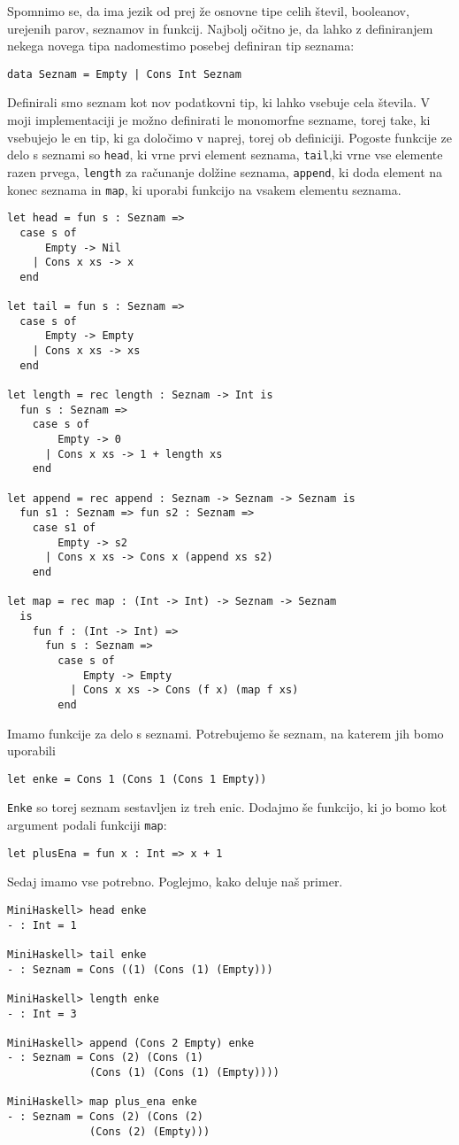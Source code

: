 \documentclass[12pt,a4paper,openany]{book}
\begin{document}
Spomnimo se, da ima jezik od prej že osnovne tipe celih števil, booleanov, urejenih parov, seznamov in funkcij. Najbolj očitno je, da lahko z definiranjem nekega novega tipa nadomestimo posebej 
definiran tip seznama:
\begin{lstlisting}
data Seznam = Empty | Cons Int Seznam
\end{lstlisting}
Definirali smo seznam kot nov podatkovni tip, ki lahko vsebuje cela števila. V moji implementaciji je možno definirati le monomorfne sezname, torej take, ki vsebujejo le en tip, ki ga določimo v naprej, torej ob definiciji. 
Pogoste funkcije ze delo s seznami so \lstinline{head}, ki vrne prvi element seznama, \lstinline{tail},ki vrne vse elemente razen prvega, \lstinline{length} za računanje 
dolžine seznama, \lstinline{append}, ki doda element na konec seznama in \lstinline{map}, ki uporabi funkcijo na vsakem elementu seznama. 
\begin{lstlisting}
let head = fun s : Seznam => 
  case s of
      Empty -> Nil
    | Cons x xs -> x
  end

let tail = fun s : Seznam =>
  case s of
      Empty -> Empty
    | Cons x xs -> xs
  end

let length = rec length : Seznam -> Int is
  fun s : Seznam =>
    case s of
        Empty -> 0
      | Cons x xs -> 1 + length xs
    end

let append = rec append : Seznam -> Seznam -> Seznam is
  fun s1 : Seznam => fun s2 : Seznam => 
    case s1 of
        Empty -> s2
      | Cons x xs -> Cons x (append xs s2)
    end

let map = rec map : (Int -> Int) -> Seznam -> Seznam 
  is
    fun f : (Int -> Int) =>
      fun s : Seznam =>
        case s of
            Empty -> Empty
          | Cons x xs -> Cons (f x) (map f xs)
        end
\end{lstlisting}
Imamo funkcije za delo s seznami. Potrebujemo še seznam, na katerem jih bomo uporabili
\begin{lstlisting}
let enke = Cons 1 (Cons 1 (Cons 1 Empty))
\end{lstlisting}
\lstinline{Enke} so torej seznam sestavljen iz treh enic. Dodajmo še funkcijo, ki jo bomo kot argument podali funkciji \lstinline{map}:
\begin{lstlisting}
let plusEna = fun x : Int => x + 1
\end{lstlisting}
Sedaj imamo vse potrebno. Poglejmo, kako deluje naš primer.
\begin{lstlisting}
MiniHaskell> head enke
- : Int = 1

MiniHaskell> tail enke
- : Seznam = Cons ((1) (Cons (1) (Empty)))

MiniHaskell> length enke
- : Int = 3

MiniHaskell> append (Cons 2 Empty) enke
- : Seznam = Cons (2) (Cons (1) 
             (Cons (1) (Cons (1) (Empty))))

MiniHaskell> map plus_ena enke
- : Seznam = Cons (2) (Cons (2) 
             (Cons (2) (Empty)))
\end{lstlisting}
\end{document}
